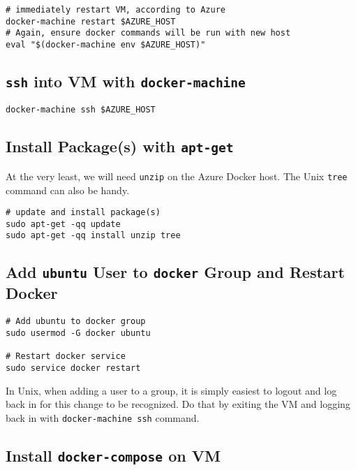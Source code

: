 \documentclass[11pt]{article}
\begin{document}
\begin{verbatim}
# immediately restart VM, according to Azure
docker-machine restart $AZURE_HOST
# Again, ensure docker commands will be run with new host
eval "$(docker-machine env $AZURE_HOST)"
\end{verbatim}

\subsection{\texttt{ssh} into VM with \texttt{docker-machine}}
\label{sec:orgheadline7}

\begin{verbatim}
docker-machine ssh $AZURE_HOST
\end{verbatim}


\subsection{Install Package(s) with \texttt{apt-get}}
\label{sec:orgheadline8}

At the very least, we will need \texttt{unzip} on the Azure Docker host. The Unix \texttt{tree} command can also be handy.

\begin{verbatim}
# update and install package(s)
sudo apt-get -qq update
sudo apt-get -qq install unzip tree
\end{verbatim}

\subsection{Add \texttt{ubuntu} User to \texttt{docker} Group and Restart Docker}
\label{sec:orgheadline9}

\begin{verbatim}
# Add ubuntu to docker group
sudo usermod -G docker ubuntu

# Restart docker service
sudo service docker restart
\end{verbatim}

In Unix, when adding a user to a group, it is simply easiest to logout and log back in for this change to be recognized. Do that by exiting the VM and logging back in with \texttt{docker-machine ssh} command.


\subsection{Install \texttt{docker-compose} on VM}
\label{sec:orgheadline10}
\end{document}
